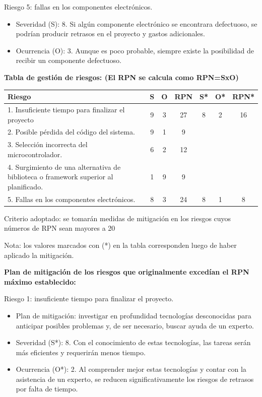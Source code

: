 \documentclass[
11pt, %
]{charter}
\begin{document}
Riesgo 5: fallas en los componentes electrónicos.
\begin{itemize}
	\item Severidad (S): 8. Si algún componente electrónico se encontrara defectuoso, se podrían producir retrasos en el proyecto y gastos adicionales.
	\item Ocurrencia (O): 3. Aunque es poco probable, siempre existe la posibilidad de recibir un componente defectuoso.
\end{itemize}


\textbf{Tabla de gestión de riesgos:      (El RPN se calcula como RPN=SxO)}

\begin{table}[htpb]
\centering
\begin{tabularx}{\linewidth}{@{}|X|c|c|c|c|c|c|@{}}
\hline
\rowcolor[HTML]{C0C0C0} 
Riesgo & S & O & RPN & S* & O* & RPN* \\ \hline
1. Insuficiente tiempo para finalizar el proyecto       & 9  & 3  &  27   &  8  & 2   &   16   \\ \hline
2. Posible pérdida del código del sistema.      & 9  & 1  &  9   &    &    &      \\ \hline
3. Selección incorrecta del microcontrolador.       & 6  & 2  &  12   &    &    &      \\ \hline
4. Surgimiento de una alternativa de biblioteca o framework superior al planificado.       & 1  & 9  &  9   &    &    &      \\ \hline
5. Fallas en los componentes electrónicos.       & 8  & 3  &  24   &  8  & 1   &  8    \\ \hline
\end{tabularx}%
\end{table}


Criterio adoptado: se tomarán medidas de mitigación en los riesgos cuyos números de RPN sean mayores a 20

Nota: los valores marcados con (*) en la tabla corresponden luego de haber aplicado la mitigación.


\textbf{Plan de mitigación de los riesgos que originalmente excedían el RPN máximo establecido:}

Riesgo 1: insuficiente tiempo para finalizar el proyecto.
\begin{itemize}
	\item Plan de mitigación: investigar en profundidad tecnologías desconocidas para anticipar posibles problemas y, de ser necesario, buscar ayuda de un experto.
	\item Severidad (S*): 8. Con el conocimiento de estas tecnologías, las tareas serán más eficientes y requerirán menos tiempo.
	\item Ocurrencia (O*): 2. Al comprender mejor estas tecnologías y contar con la asistencia de un experto, se reducen significativamente los riesgos de retrasos por falta de tiempo.
\end{itemize}
\end{document}
